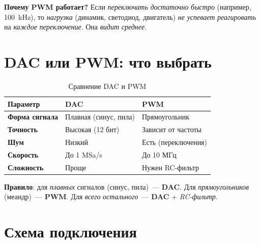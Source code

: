\begin{keybox}
\textbf{Почему PWM работает?} Если \emph{переключать}
\emph{достаточно} \emph{быстро} (например, \SI{100}{\kilo\hertz}),
то \emph{нагрузка} (динамик, светодиод, двигатель)
\emph{не} \emph{успевает} \emph{реагировать} на \emph{каждое}
\emph{переключение}. Она \emph{видит} \emph{среднее}.
\end{keybox}

\section{DAC или PWM: что выбрать}
\label{sec:gen-dac-vs-pwm}

\begin{table}[htbp]
\centering
\caption{Сравнение DAC и PWM}
\label{tab:gen-dac-vs-pwm}
\small
\begin{tabularx}{\textwidth}{@{}L L L@{}}
\toprule
\textbf{Параметр} & \textbf{DAC} & \textbf{PWM} \\
\midrule
\textbf{Форма сигнала} & Плавная (синус, пила) & Прямоугольник \\
\textbf{Точность} & Высокая (12 бит) & Зависит от частоты \\
\textbf{Шум} & Низкий & Есть (переключения) \\
\textbf{Скорость} & До 1 MSa/s & До 10 МГц \\
\textbf{Сложность} & Проще & Нужен RC-фильтр \\
\bottomrule
\end{tabularx}
\end{table}

\begin{keybox}
\textbf{Правило}: для \emph{плавных} сигналов (синус,
пила)~--- \textbf{DAC}. Для \emph{прямоугольников}
(меандр)~--- \textbf{PWM}. Для \emph{всего} \emph{остального}~---
\textbf{DAC} + \emph{RC-фильтр}.
\end{keybox}

\section{Схема подключения}
\label{sec:gen-schematic}

